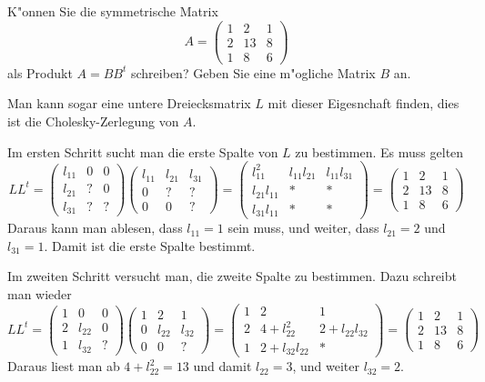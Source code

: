 K"onnen Sie die symmetrische Matrix
\[
A=\begin{pmatrix}
1& 2&1\\
2&13&8\\
1& 8&6
\end{pmatrix}
\]
als Produkt $A=BB^t$ schreiben? Geben Sie eine m"ogliche Matrix $B$ an.

\begin{loesung}
Man kann sogar eine untere Dreiecksmatrix $L$ mit dieser Eigesnchaft finden,
dies ist die Cholesky-Zerlegung von $A$.

Im ersten Schritt sucht man die erste Spalte von $L$ zu bestimmen.
Es muss gelten
\[
LL^t=
\begin{pmatrix}
l_{11}&  0&  0\\
l_{21}&  ?&  0\\
l_{31}&  ?&  ?
\end{pmatrix}
\begin{pmatrix}
l_{11}&l_{21}&l_{31}\\
     0&     ?&     ?\\
     0&     0&     ?
\end{pmatrix}
=
\begin{pmatrix}
    l_{11}^2&l_{11}l_{21}&l_{11}l_{31}\\
l_{21}l_{11}&           *&           *\\
l_{31}l_{11}&           *&           *
\end{pmatrix}
=
\begin{pmatrix}
1& 2&1\\
2&13&8\\
1& 8&6
\end{pmatrix}
\]
Daraus kann man ablesen, dass $l_{11}=1$ sein muss, und weiter,
dass
$l_{21}=2$ und $l_{31}=1$. Damit ist die erste Spalte bestimmt.

Im zweiten Schritt versucht man, die zweite Spalte zu bestimmen.
Dazu schreibt man wieder
\[
LL^t
=
\begin{pmatrix}
1&     0&0\\
2&l_{22}&0\\
1&l_{32}&?
\end{pmatrix}
\begin{pmatrix}
1&     2&     1\\
0&l_{22}&l_{32}\\
0&     0&?
\end{pmatrix}
=
\begin{pmatrix}
1&2           &           1\\
2&4+l_{22}^2  &2+l_{22}l_{32}\\
1&2+l_{32}l_{22}&         *
\end{pmatrix}
=
\begin{pmatrix}
1& 2&1\\
2&13&8\\
1& 8&6
\end{pmatrix}
\]
Daraus liest man ab $4+l_{22}^2=13$ und damit $l_{22}=3$, und weiter
$l_{32}=2$.


\end{loesung}
